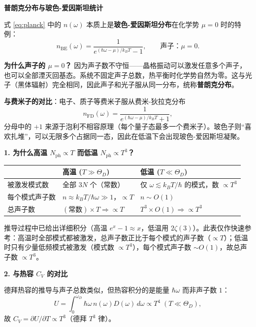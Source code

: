 \begin{insightbox}[物理图像与概念深化]
\textbf{普朗克分布与玻色-爱因斯坦统计}

式 \eqref{eq:planck} 中的 $n(\omega)$ 本质上是\textbf{玻色-爱因斯坦分布}在化学势 $\mu=0$ 时的特例：
\begin{equation}
n_\mathrm{BE}(\omega)=\frac{1}{e^{(\hbar\omega-\mu)/k_BT}-1},\qquad \text{声子：}\mu=0.
\end{equation}

\textbf{为什么声子的 $\mu=0$？} 因为声子数不守恒——晶格振动可以激发任意多个声子，也可以全部湮灭回基态。系统不固定声子总数，热平衡时化学势自然为零。这与光子（黑体辐射）完全相同，因此声子和光子服从同一分布，统称\textbf{普朗克分布}。

\textbf{与费米子的对比}：电子、质子等费米子服从费米-狄拉克分布
\begin{equation}
n_\mathrm{FD}(\omega)=\frac{1}{e^{(\hbar\omega-\mu)/k_BT}+1},
\end{equation}
分母中的 $+1$ 来源于泡利不相容原理（每个量子态最多一个费米子）。玻色子则``喜欢扎堆''，可以无限多个占据同一态，因此在低温下会出现玻色-爱因斯坦凝聚。

\textbf{1. 为什么高温 $N_{\text{ph}}\propto T$ 而低温 $N_{\text{ph}}\propto T^3$？}

\begin{center}
\begin{tabular}{p{3cm}p{5cm}p{5cm}}
\toprule
 & \textbf{高温} ($T\gg\Theta_D$) & \textbf{低温} ($T\ll\Theta_D$) \\
\midrule
被激发模式数 & 全部 $3N$ 个（常数） & 仅 $\omega\lesssim k_BT/\hbar$ 的模式，数 $\propto T^3$ \\
每个模式声子数 & $n\approx k_BT/\hbar\omega\gg1$，$\propto T$ & $n\sim O(1)$ \\
总声子数 & $(\text{常数})\times T\Rightarrow\propto T$ & $T^3\times O(1)\Rightarrow\propto T^3$ \\
\bottomrule
\end{tabular}
\end{center}

推导过程中已给出详细积分（高温 $e^x-1\approx x$，低温用 $2\zeta(3)$）。此表仅作快速参考：高温时全部模式都被激发，总声子数正比于每个模式的声子数（$\propto T$）；低温时只有少量低频模式被激发（模式数 $\propto T^3$），每个模式声子数 $\sim O(1)$，故总声子数 $\propto T^3$。

\textbf{2. 与热容 $C_V$ 的对比}

德拜热容的推导与声子总数类似，但热容积分的是能量 $\hbar\omega$ 而非声子数 $1$：
\begin{equation}
U=\int_0^{\omega_D}\hbar\omega\,n(\omega)D(\omega)\,d\omega\propto T^4\;(T\ll\Theta_D),
\end{equation}
故 $C_V=\partial U/\partial T\propto T^3$（德拜 $T^3$ 律）。


\end{insightbox}
